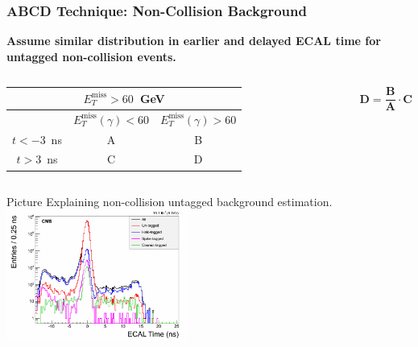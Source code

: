 \documentclass{beamer}
\begin{document}
\begin{frame}
\frametitle{ABCD Technique: Non-Collision Background}
 \begin{minipage}[t]{0.8\paperwidth}
\vspace{-0.75cm}
  \begin{varblock}[7.2cm]{\textbf{Assume similar distribution in earlier and delayed ECAL time for untagged non-collision events.}}
   \begin{columns}
      \centering
        \begin{tabular}{|c || c|| c|}
        \multicolumn{3}{c}{\bfseries{$E^{\mbox{miss}}_{T} > 60$~GeV}} \\
        \hline \hline
          & $ E^{\mbox{miss}}_{T}(\gamma) < 60$ & $E^{\mbox{miss}}_{T}(\gamma) > 60$ \\       
          \hline \hline
          $ t < -3$~ns & A &  B \\
          \hline \hline \hline         
          $ t > 3$~ns & C &  D \\
        \hline \hline
        \end{tabular} 
      \begin{tcolorbox}[colback=blue!5,colframe=UMN@Gold!40]
      \begin{equation*}
      \mathbf{D = \frac{B}{A}\cdot C }
     \end{equation*}
     \end{tcolorbox}
    \end{columns}
\end{varblock}
\end{minipage}
\begin{minipage}[b]{\paperwidth}
Picture Explaining non-collision untagged background estimation. 
\mbox{
 \includegraphics[height=4.30cm,width=0.7\paperwidth]{THESISPLOTS/TimeForAll.png}
 } 
\end{minipage}
\end{frame}
\end{document}
